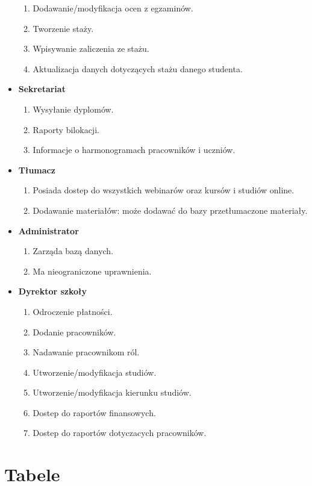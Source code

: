 \documentclass[11pt]{article}
\begin{document}
\begin{itemize}
\begin{enumerate}
\item Dodawanie/modyfikacja ocen z egzaminów.
\item Tworzenie staży.
\item Wpisywanie zaliczenia ze stażu.
\item Aktualizacja danych dotyczących stażu danego studenta.
\end{enumerate}
\item \textbf{Sekretariat}
\begin{enumerate}
\item Wysyłanie dyplomów.
\item Raporty bilokacji.
\item Informacje o harmonogramach pracowników i uczniów.
\end{enumerate}
\item \textbf{Tłumacz}
\begin{enumerate}
\item Posiada dostep do wszystkich webinarów oraz kursów i studiów online.
\item Dodawanie materiałów: może dodawać do bazy przetłumaczone materiały.
\end{enumerate}
\item \textbf{Administrator}
\begin{enumerate}
\item Zarząda bazą danych.
\item Ma nieograniczone uprawnienia.
\end{enumerate}
\item \textbf{Dyrektor szkoły}
\begin{enumerate}
\item Odroczenie płatności.
\item Dodanie pracowników.
\item Nadawanie pracownikom ról.
\item Utworzenie/modyfikacja studiów.
\item Utworzenie/modyfikacja kierunku studiów.
\item Dostep do raportów finansowych.
\item Dostep do raportów dotyczacych pracowników.
\end{enumerate}
\end{itemize}
\section{Tabele}
\label{sec:orgcdc8edd}
\end{document}
